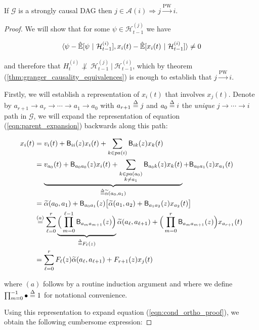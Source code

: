 \documentclass[12pt]{article}
\def\pwgc{\overset{\text{PW}}{\rightarrow}}  %
\def\gcg{\mathcal{G}}  %
\def\B{\mathsf{B}}  %
\def\H{\mathcal{H}}  %
\newcommand{\linE}[2]{\hat{\E}[#1\ |\ #2]}  %
\newcommand{\pa}[1]{pa(#1)}  %
\newcommand{\anc}[1]{\mathcal{A}(#1)}  %
\newcommand{\wtalpha}[2]{\widetilde{\alpha}(#1, #2)}  %
\newcommand{\gcgpath}[2]{#1 \rightarrow \cdots \rightarrow #2}  %
\begin{document}
\begin{proposition}
  \label{prop:pwgc_anc}
  If $\gcg$ is a strongly causal DAG then $j \in \anc{i} \Rightarrow j \pwgc i$.
\end{proposition}
\begin{proof}
  We will show that for some $\psi \in \H_{t - 1}^{(j)}$ we have

  \begin{equation}
    \label{eqn:cond_ortho_proof}
    \inner{\psi - \linE{\psi}{\H_{t - 1}^{(i)}}}{x_i(t) - \linE{x_i(t)}{\H_{t - 1}^{(i)}}} \ne 0
  \end{equation}

  and therefore that $H_t^{(i)} \not\perp\ \H_{t - 1}^{(j)}\ |\ \H_{t - 1}^{(i)}$, which by theorem (\ref{thm:granger_causality_equivalences}) is enough to establish that $j \pwgc i$.

  Firstly, we will establish a representation of $x_i(t)$ that involves $x_j(t)$.  Denote by $a_{r + 1} \rightarrow a_r \rightarrow \cdots \rightarrow a_1 \rightarrow a_0$ with $a_{r + 1} \overset{\Delta}{=} j$ and $a_0 \overset{\Delta}{=} i$ the \textit{unique} $\gcgpath{j}{i}$ path in $\gcg$, we will expand the representation of equation (\ref{eqn:parent_expansion}) backwards along this path:

  \begin{align*}
    x_i(t) &= v_i(t) + \B_{ii}(z) x_i(t) + \sum_{k \in \pa{i}}\B_{ik}(z) x_k(t)\\
           &= \underbrace{v_{a_0}(t) + \B_{a_0a_0}(z) x_i(t) + \sum_{\substack{k \in \pa{a_0} \\ k \ne a_1}}\B_{a_0 k}(z) x_k(t)}_{\defeq \wtalpha{a_0}{a_1}} + \B_{a_0a_1}(z)x_{a_1}(t)\\
           &= \wtalpha{a_0}{a_1} + \B_{a_0a_1}(z)\big[\wtalpha{a_1}{a_2} + \B_{a_1a_2}(z)x_{a_2}(t) \big]\\
           &\overset{(a)}{=} \sum_{\ell = 0}^r \underbrace{\Big(\prod_{m = 0}^{\ell - 1} \B_{a_m a_{m + 1}}(z) \Big)}_{\defeq F_\ell(z)} \wtalpha{a_\ell}{a_{\ell + 1}} + \Big(\prod_{m = 0}^{r}\B_{a_m a_{m + 1}}(z)\Big)x_{a_{r + 1}}(t)\\
           &= \sum_{\ell = 0}^r F_\ell(z) \wtalpha{a_\ell}{a_{\ell + 1}} + F_{r + 1}(z) x_j(t)
  \end{align*}

  where $(a)$ follows by a routine induction argument and where we define $\prod_{m = 0}^{-1} \bullet \overset{\Delta}{=} 1$ for notational convenience.

  Using this representation to expand equation (\ref{eqn:cond_ortho_proof}), we obtain the following cumbersome expression:


\end{proof}
\end{document}
